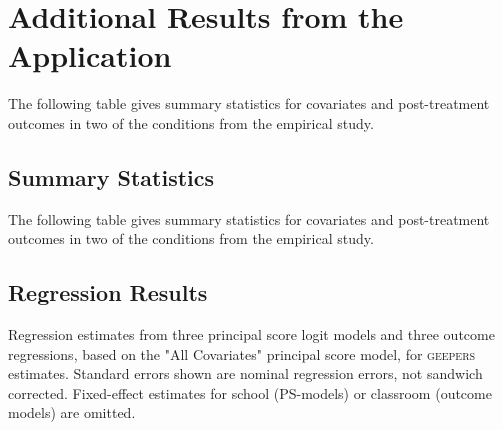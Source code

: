 \documentclass[]{article}
\begin{document}
\section{Additional Results from the Application}
\singlespacing
The following table gives summary statistics for covariates and post-treatment outcomes in two of the conditions from the empirical study.\\


\subsection{Summary Statistics}
The following table gives summary statistics for covariates and post-treatment outcomes in two of the conditions from the empirical study.\\
\small

\clearpage

\small


\subsection{Regression Results}
Regression estimates from three principal score logit models and three outcome regressions, based on the "All Covariates" principal score model, for \textsc{geepers} estimates. Standard errors shown are nominal regression errors, not sandwich corrected. Fixed-effect estimates for school (PS-models) or classroom (outcome models) are omitted.

\small
%




\end{document}
